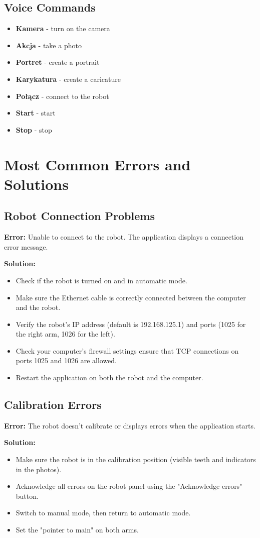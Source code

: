 \documentclass[a4paper,12pt]{article}
\begin{document}
\subsection{Voice Commands}
\begin{itemize}
\item \textbf{Kamera} - turn on the camera
\item \textbf{Akcja} - take a photo
\item \textbf{Portret} - create a portrait
\item \textbf{Karykatura} - create a caricature
\item \textbf{Połącz} - connect to the robot
\item \textbf{Start} - start
\item \textbf{Stop} - stop
\end{itemize}
\section{Most Common Errors and Solutions}

\subsection{Robot Connection Problems}
\textbf{Error:} Unable to connect to the robot. The application displays a connection error message.

\textbf{Solution:}
\begin{itemize}
\item Check if the robot is turned on and in automatic mode.
\item Make sure the Ethernet cable is correctly connected between the computer and the robot.
\item Verify the robot's IP address (default is 192.168.125.1) and ports (1025 for the right arm, 1026 for the left).
\item Check your computer's firewall settings ensure that TCP connections on ports 1025 and 1026 are allowed.
\item Restart the application on both the robot and the computer.
\end{itemize}

\subsection{Calibration Errors}
\textbf{Error:} The robot doesn't calibrate or displays errors when the application starts.

\textbf{Solution:}
\begin{itemize}
\item Make sure the robot is in the calibration position (visible teeth and indicators in the photos).
\item Acknowledge all errors on the robot panel using the "Acknowledge errors" button.
\item Switch to manual mode, then return to automatic mode.
\item Set the "pointer to main" on both arms.
\end{itemize}
\end{document}
